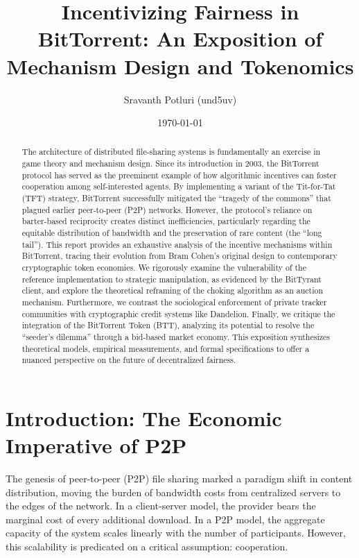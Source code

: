 \documentclass[12pt]{article}
\title{\textbf{Incentivizing Fairness in BitTorrent: An Exposition of Mechanism Design and Tokenomics}}
\author{Sravanth Potluri (und5uv)}
\date{\today}
\begin{document}
\maketitle

\begin{abstract}
The architecture of distributed file-sharing systems is fundamentally an exercise in game theory and mechanism design. Since its introduction in 2003, the BitTorrent protocol has served as the preeminent example of how algorithmic incentives can foster cooperation among self-interested agents. By implementing a variant of the Tit-for-Tat (TFT) strategy, BitTorrent successfully mitigated the ``tragedy of the commons'' that plagued earlier peer-to-peer (P2P) networks. However, the protocol's reliance on barter-based reciprocity creates distinct inefficiencies, particularly regarding the equitable distribution of bandwidth and the preservation of rare content (the ``long tail''). This report provides an exhaustive analysis of the incentive mechanisms within BitTorrent, tracing their evolution from Bram Cohen’s original design to contemporary cryptographic token economies. We rigorously examine the vulnerability of the reference implementation to strategic manipulation, as evidenced by the BitTyrant client, and explore the theoretical reframing of the choking algorithm as an auction mechanism. Furthermore, we contrast the sociological enforcement of private tracker communities with cryptographic credit systems like Dandelion. Finally, we critique the integration of the BitTorrent Token (BTT), analyzing its potential to resolve the ``seeder's dilemma'' through a bid-based market economy. This exposition synthesizes theoretical models, empirical measurements, and formal specifications to offer a nuanced perspective on the future of decentralized fairness.
\end{abstract}

\newpage

\section{Introduction: The Economic Imperative of P2P}

The genesis of peer-to-peer (P2P) file sharing marked a paradigm shift in content distribution, moving the burden of bandwidth costs from centralized servers to the edges of the network. In a client-server model, the provider bears the marginal cost of every additional download. In a P2P model, the aggregate capacity of the system scales linearly with the number of participants. However, this scalability is predicated on a critical assumption: cooperation.
\end{document}

